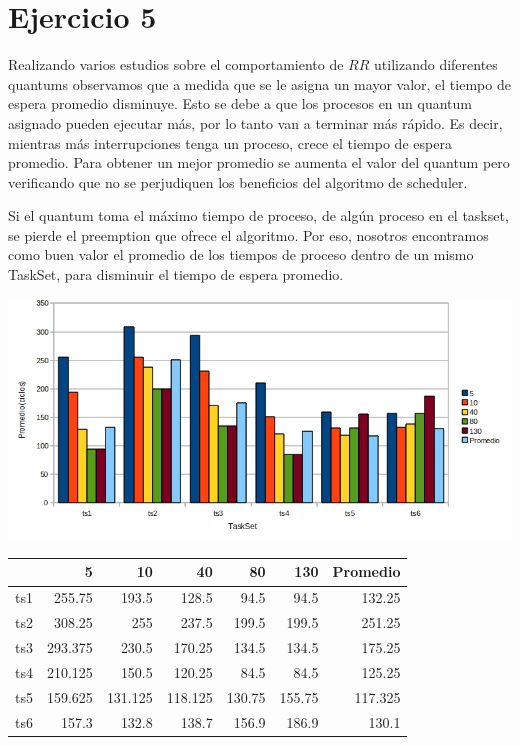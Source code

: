 \documentclass[a4paper, 10pt]{article}
\begin{document}
\section{Ejercicio 5}
	Realizando varios estudios sobre el comportamiento de $RR$ utilizando diferentes quantums observamos que a medida que se le asigna un mayor valor, el tiempo de espera promedio disminuye. Esto se debe a que los procesos en un quantum asignado pueden ejecutar m\'as, por lo tanto van a terminar m\'as r\'apido. Es decir, mientras m\'as interrupciones tenga un proceso, crece el tiempo de espera promedio. Para obtener un mejor promedio se aumenta el valor del quantum pero verificando que no se perjudiquen los beneficios del algoritmo de scheduler.

Si el quantum toma el m\'aximo tiempo de proceso, de alg\'un proceso en el taskset, se pierde el preemption que ofrece el algoritmo.
Por eso, nosotros encontramos como buen valor el promedio de los tiempos de proceso dentro de un mismo TaskSet, para disminuir el tiempo de espera promedio.

\begin{center}
	\includegraphics[scale=0.4]{graficos/ejercicio5_RR.jpg}
\end{center}

\begin{center}
	\begin{tabular}{|r|r|r|r|r|r|r|}
	  \hline
		    &  5 & 10 & 40 & 80 & 130 & Promedio \\
	  \hline
		ts1 & 255.75 & 193.5 & 128.5 & 94.5 & 94.5 & 132.25 \\
	  \hline
		ts2 & 308.25 & 255 & 237.5 & 199.5 & 199.5 & 251.25 \\
		\hline
		ts3 & 293.375 & 230.5 & 170.25 & 134.5 & 134.5 & 175.25 \\
		\hline
		ts4 & 210.125 & 150.5 & 120.25 & 84.5 & 84.5 & 125.25 \\
		\hline
		ts5 & 159.625 & 131.125 & 118.125 & 130.75 & 155.75 & 117.325 \\
		\hline
		ts6 & 157.3 & 132.8 & 138.7 & 156.9 & 186.9 & 130.1 \\
		\hline
	\end{tabular}
	\label{tab:}
\end{center}
\end{document}
